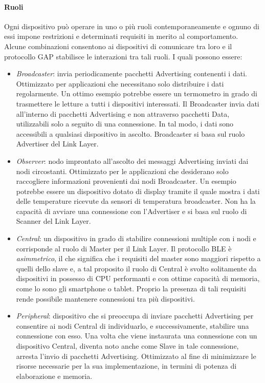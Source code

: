 \paragraph{Ruoli}
Ogni dispositivo può operare in uno o più ruoli contemporaneamente e ognuno di essi impone restrizioni e determinati requisiti in merito al comportamento. Alcune combinazioni consentono ai dispositivi di comunicare tra loro e il protocollo GAP stabilisce le interazioni tra tali ruoli. I quali possono essere:
\begin{itemize}
    \item \textit{Broadcaster}: invia periodicamente pacchetti Advertising contenenti i dati. Ottimizzato per applicazioni che necessitano solo distribuire i dati regolarmente. Un ottimo esempio potrebbe essere un termometro in grado di trasmettere le letture a tutti i dispositivi interessati. Il Broadcaster invia dati all'interno di pacchetti Advertising e non attraverso pacchetti Data, utilizzabili solo a seguito di una connessione. In tal modo, i dati sono accessibili a qualsiasi dispositivo in ascolto. Broadcaster si basa sul ruolo Advertiser del Link Layer.
    
    \item \textit{Observer}: nodo improntato all'ascolto dei messaggi Advertising inviati dai nodi circostanti. Ottimizzato per le applicazioni che desiderano solo raccogliere informazioni provenienti dai nodi Broadcaster. Un esempio potrebbe essere un dispositivo dotato di display tramite il quale mostra i dati delle temperature ricevute da sensori di temperatura broadcaster.  Non ha la capacità di avviare una connessione con l'Advertiser e si basa sul ruolo di Scanner del Link Layer.
    
    \item \textit{Central}: un dispositivo in grado di stabilire connessioni multiple con i nodi e corrisponde al ruolo di Master per il Link Layer. Il protocollo BLE è \textit{asimmetrico}, il che significa che i requisiti del master sono maggiori rispetto a quelli dello slave e, a tal proposito il ruolo di Central è svolto solitamente da dispositivi in possesso di CPU performanti e con ottime capacità di memoria, come lo sono gli smartphone o tablet. Proprio la presenza di tali requisiti rende possibile mantenere connessioni tra più dispositivi. 
    
    \item \textit{Peripheral}: dispositivo che si preoccupa di inviare pacchetti Advertising per consentire ai nodi Central di individuarlo, e successivamente, stabilire una connessione con esso. Una volta che viene instaurata una connessione con un dispositivo Central, diventa noto anche come Slave in tale connessione, arresta l'invio di pacchetti Advertising. Ottimizzato al fine di minimizzare le risorse necessarie per la sua implementazione, in termini di potenza di elaborazione e memoria.
\end{itemize}

